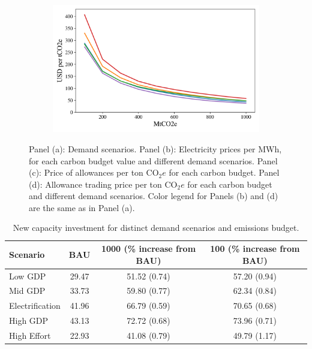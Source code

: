 \documentclass[11pt, letterpaper]{article}
\begin{document}
\begin{figure}[ht]
\begin{subfigure}[t]{0.5\linewidth}
    \caption{  }
  \label{fig:price_allo}
  \end{subfigure}
    \begin{subfigure}[t]{0.5\linewidth}
    \includegraphics[width=\textwidth]{draft_paper/Figures/prices_trading_scenarios.png}
    \caption{}
  \label{fig:price_trade}
  \end{subfigure}\quad
   \caption{Panel (a): Demand scenarios. Panel (b): Electricity prices per MWh, for each carbon budget value and different demand scenarios. Panel (c): Price of allowances per ton CO$_2e$ for each carbon budget. Panel (d): Allowance trading price per ton CO$_2e$ for each carbon budget and different demand scenarios. Color legend for Panels (b) and (d) are the same as in Panel (a).}
\end{figure}

\small
\begin{table}[h]
    \centering
    \begin{tabular}{ l| c c c   } 
\hline
Scenario	    &	BAU    	&	1000 (\% increase from BAU)	    &	100 (\% increase from BAU)	        \\
\hline
Low GDP	        &	29.47	&	51.52 (0.74)	&	57.20 (0.94)	\\
Mid GDP 	    &	33.73	&	59.80 (0.77)	&	62.34 (0.84) 	\\
Electrification	&	41.96	&	66.79 (0.59)	&	70.65 (0.68)	\\
High GDP	    &	43.13	&	72.72 (0.68)	&	73.96 (0.71)	\\
High Effort	    &	22.93   &	41.08 (0.79)	&	49.79 (1.17)	\\
\hline
\end{tabular}
    \caption{New capacity investment for distinct demand scenarios and emissions budget.}
    \label{tab:InvestmentStoch}
\end{table}
\normalsize
\end{document}
